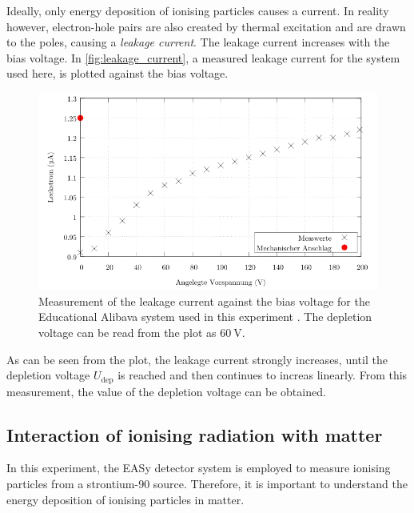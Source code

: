 Ideally, only energy deposition of ionising particles causes a current. In reality however, electron-hole pairs are also created by thermal excitation and are drawn to the poles,
causing a \textit{leakage current}. The leakage current increases with the bias voltage. In \autoref{fig:leakage_current}, a measured leakage current for the system used here,
is plotted against the bias voltage. 
\begin{figure}
    \centering 
    \includegraphics[width = .75\textwidth]{content/pics/leakage_current.png}
    \caption{Measurement of the leakage current against the bias voltage for the Educational Alibava system used in this experiment \cite{SiliconStrip}. 
    The depletion voltage can be read from the plot as $\qty{60}{\volt}$.}
    \label{fig:leakage_current}
\end{figure}
As can be seen from the plot, the leakage current strongly increases, until the depletion voltage $U_\text{dep}$ is reached and then continues to increas linearly.
From this measurement, the value of the depletion voltage can be obtained.

\subsection{Interaction of ionising radiation with matter}
In this experiment, the EASy detector system is employed to measure ionising particles from a strontium-90 source. 
Therefore, it is important to understand the energy deposition of ionising particles in matter.

